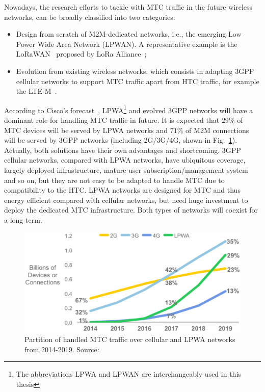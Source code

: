Nowadays, the research efforts to tackle with MTC traffic in the future wireless networks, can be broadly classified into two categories: \begin{itemize}[leftmargin=*, noitemsep]
	\item Design from scratch of M2M-dedicated networks, i.e., the emerging Low Power Wide Area Network (LPWAN). A representative example is the LoRaWAN~\cite{lora/specification} proposed by LoRa Alliance~\cite{lora_alliance};
	\item Evolution from existing wireless networks, which consists in adapting 3GPP cellular networks to support MTC traffic apart from HTC traffic, for example the LTE-M~\cite{ratasuk2014narrowband}.
\end{itemize}
According to Cisco's forecast~\cite{cisco2015forecast}, LPWA\footnote{The abbreviations LPWA and LPWAN are interchangeably used in this thesis} and evolved 3GPP networks will have a dominant role for handling MTC traffic in future. It is expected that $29\%$ of MTC devices will be served by LPWA networks and $71\%$ of M2M connections will be served by 3GPP networks (including 2G/3G/4G, shown in Fig.~\ref{fig:m2m-evolution-trend}). Actually, both solutions have their own advantages and shortcoming. 3GPP cellular networks, compared with LPWA networks, have ubiquitous coverage, largely deployed infrastructure, mature user subscription/management system and so on, but they are not easy to be adapted to handle MTC due to compatibility to the HTC. LPWA networks are designed for MTC and thus energy efficient compared with cellular networks, but need huge investment to deploy the dedicated MTC infrastructure. Both types of networks will coexist for a long term.
\begin{figure}[h]
	\centering
	\includegraphics[width=0.8\linewidth]{Chapter1/Figures/Global-mobile-m2m-connections-share}
	\caption{Partition of handled MTC traffic over cellular and LPWA networks from 2014-2019. Source: \cite{cisco2015forecast}}
	\label{fig:m2m-evolution-trend}
\end{figure}

